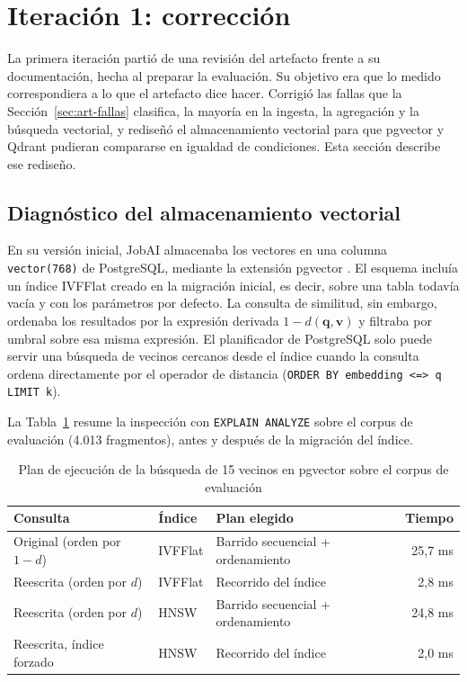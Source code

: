 \section{Iteración 1: corrección}
\label{sec:art-vectorial}

La primera iteración partió de una revisión del artefacto frente a su documentación, hecha al preparar la evaluación. Su objetivo era que lo medido correspondiera a lo que el artefacto dice hacer. Corrigió las fallas que la Sección~\ref{sec:art-fallas} clasifica, la mayoría en la ingesta, la agregación y la búsqueda vectorial, y rediseñó el almacenamiento vectorial para que pgvector y Qdrant pudieran compararse en igualdad de condiciones. Esta sección describe ese rediseño.

\subsection{Diagnóstico del almacenamiento vectorial}

En su versión inicial, JobAI almacenaba los vectores en una columna \texttt{vector(768)} de PostgreSQL, mediante la extensión pgvector \citep{Pgvector}. El esquema incluía un índice IVFFlat creado en la migración inicial, es decir, sobre una tabla todavía vacía y con los parámetros por defecto. La consulta de similitud, sin embargo, ordenaba los resultados por la expresión derivada $1 - d(\mathbf{q}, \mathbf{v})$ y filtraba por umbral sobre esa misma expresión. El planificador de PostgreSQL solo puede servir una búsqueda de vecinos cercanos desde el índice cuando la consulta ordena directamente por el operador de distancia (\texttt{ORDER BY embedding <=> q LIMIT k}).

La Tabla~\ref{tab:art-explain} resume la inspección con \texttt{EXPLAIN ANALYZE} sobre el corpus de evaluación (4.013 fragmentos), antes y después de la migración del índice.

\begin{table}[htbp!]
    \centering
    \caption{Plan de ejecución de la búsqueda de 15 vecinos en pgvector sobre el corpus de evaluación}
    \label{tab:art-explain}
    \begin{tabular}{|p{5.2cm}|p{2.2cm}|p{4.6cm}|r|}
        \hline
        \textbf{Consulta} & \textbf{Índice} & \textbf{Plan elegido} & \textbf{Tiempo} \\
        \hline
        Original (orden por $1-d$) & IVFFlat & Barrido secuencial + ordenamiento & 25,7 ms \\
        \hline
        Reescrita (orden por $d$) & IVFFlat & Recorrido del índice & 2,8 ms \\
        \hline
        Reescrita (orden por $d$) & HNSW & Barrido secuencial + ordenamiento & 24,8 ms \\
        \hline
        Reescrita, índice forzado & HNSW & Recorrido del índice & 2,0 ms \\
        \hline
    \end{tabular}
\end{table}

